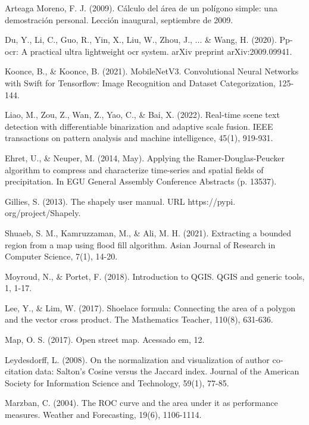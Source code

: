 \documentclass[twocolumn, fontsize=10pt]{article}
\begin{document}
\begin{thebibliography}{}

  \sloppypar
   Arteaga Moreno, F. J. (2009). Cálculo del área de un polígono simple: una demostración personal. Lección inaugural, septiembre de 2009.


   Du, Y., Li, C., Guo, R., Yin, X., Liu, W., Zhou, J., ... \& Wang, H. (2020). Pp-ocr: A practical ultra lightweight ocr system. arXiv preprint arXiv:2009.09941. 

     Koonce, B., \& Koonce, B. (2021). MobileNetV3. Convolutional Neural Networks with Swift for Tensorflow: Image Recognition and Dataset Categorization, 125-144.

     Liao, M., Zou, Z., Wan, Z., Yao, C., \& Bai, X. (2022). Real-time scene text detection with differentiable binarization and adaptive scale fusion. IEEE transactions on pattern analysis and machine intelligence, 45(1), 919-931.

     Ehret, U., \& Neuper, M. (2014, May). Applying the Ramer-Douglas-Peucker algorithm to compress and characterize time-series and spatial fields of precipitation. In EGU General Assembly Conference Abstracts (p. 13537).

     Gillies, S. (2013). The shapely user manual. URL https://pypi. org/project/Shapely.

     Shuaeb, S. M., Kamruzzaman, M., \& Ali, M. H. (2021). Extracting a bounded region from a map using flood fill algorithm. Asian Journal of Research in Computer Science, 7(1), 14-20.

     Moyroud, N., \& Portet, F. (2018). Introduction to QGIS. QGIS and generic tools, 1, 1-17.

     Lee, Y., \& Lim, W. (2017). Shoelace formula: Connecting the area of a polygon and the vector cross product. The Mathematics Teacher, 110(8), 631-636.

     Map, O. S. (2017). Open street map. Acessado em, 12.

     Leydesdorff, L. (2008). On the normalization and visualization of author co‐citation data: Salton's Cosine versus the Jaccard index. Journal of the American Society for Information Science and Technology, 59(1), 77-85.
    
     Marzban, C. (2004). The ROC curve and the area under it as performance measures. Weather and Forecasting, 19(6), 1106-1114.


\end{thebibliography}
\end{document}
